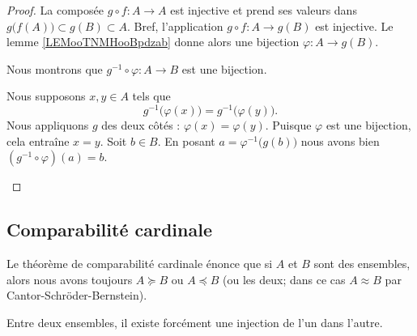 \begin{proof}
	La composée \( g\circ f\colon A\to A\) est injective et prend ses valeurs dans \( g\big( f(A) \big)\subset g(B)\subset A\). Bref, l'application \( g\circ f\colon A \to g(B)\) est injective. Le lemme \ref{LEMooTNMHooBpdzab} donne alors une bijection \( \varphi\colon A\to g(B)\).

	Nous montrons que \( g^{-1}\circ\varphi\colon A\to B\) est une bijection.

	\begin{subproof}
		\spitem[Injective]
		Nous supposons \( x,y\in A\) tels que
		\begin{equation}
			g^{-1}\big( \varphi(x) \big)=g^{-1}\big( \varphi(y) \big).
		\end{equation}
		Nous appliquons \( g\) des deux côtés : \( \varphi(x)=\varphi(y)\). Puisque \( \varphi\) est une bijection, cela entraîne \( x=y\).
		\spitem[Surjective]
		Soit \( b\in B\). En posant \( a=\varphi^{-1}\big( g(b) \big)\) nous avons bien \( (g^{-1}\circ \varphi)(a)=b\).
	\end{subproof}
\end{proof}

\subsection{Comparabilité cardinale}
\label{SUBooComparabiliteCardinale}

\begin{normaltext}\label{NORooThmComparCardIntro}
	Le théorème de comparabilité cardinale énonce que si \( A\) et \( B\) sont des ensembles, alors nous avons toujours \( A\succeq B\) ou \( A\preceq B\) (ou les deux; dans ce cas \( A\approx B\) par Cantor-Schröder-Bernstein).
\end{normaltext}

\begin{theorem}     \label{THOooCBSKooCmzfUf}
	Entre deux ensembles, il existe forcément une injection de l'un dans l'autre.
\end{theorem}

